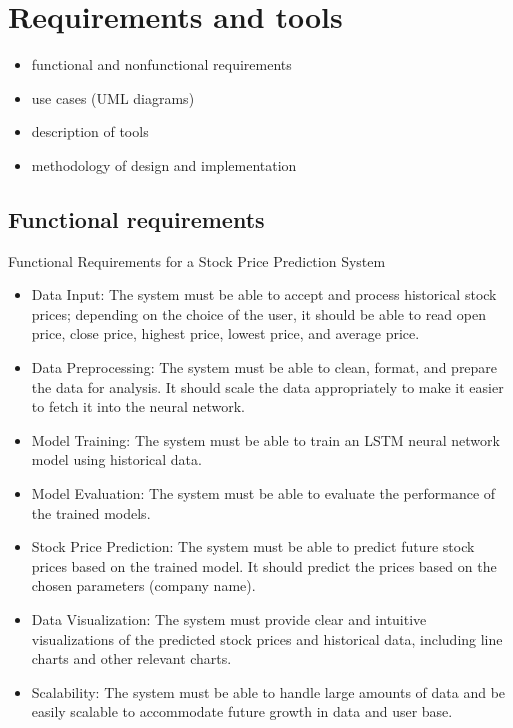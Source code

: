 \chapter{Requirements and tools}

\begin{itemize}
\item functional and nonfunctional requirements
\item use cases (UML diagrams)
\item description of tools
\item methodology of design and implementation
\end{itemize} 

\section{Functional requirements}
Functional Requirements for a Stock Price Prediction System
\begin{itemize}
    \item Data Input: The system must be able to accept and process historical stock prices; depending on the choice of the user, it should be able to read open price, close price, highest price, lowest price, and average price.
    \item Data Preprocessing: The system must be able to clean, format, and prepare the data for analysis. It should scale the data appropriately to make it easier to fetch it into the neural network.
    \item Model Training: The system must be able to train an LSTM neural network model using historical data.
    \item Model Evaluation: The system must be able to evaluate the performance of the trained models.
    \item Stock Price Prediction: The system must be able to predict future stock prices based on the trained model. It should predict the prices based on the chosen parameters (company name).
    \item Data Visualization: The system must provide clear and intuitive visualizations of the predicted stock prices and historical data, including line charts and other relevant charts.
    \item Scalability: The system must be able to handle large amounts of data and be easily scalable to accommodate future growth in data and user base.
\end{itemize} 

